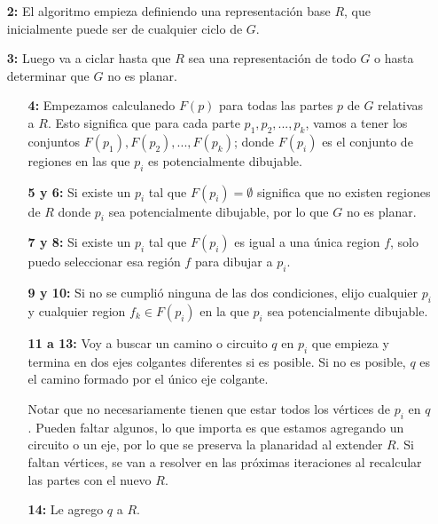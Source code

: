 \begin{enumerate}
\item [\textbf{2:}] El algoritmo empieza definiendo una representaci\'on base $R$, que inicialmente puede ser de cualquier ciclo de $G$. 
\item [\textbf{3:}] Luego va a ciclar hasta que $R$ sea una representaci\'on de todo $G$ o hasta determinar que $G$ no es planar.
    \begin{enumerate}
    \item [\textbf{4:}] Empezamos calculanedo $F(p)$ para todas las partes $p$ de $G$ relativas a $R$. Esto significa que para cada parte $p_1, p_2, ..., p_k$, vamos a tener los conjuntos $F(p_1), F(p_2), ..., F(p_k)$; donde $F(p_i)$ es el conjunto de regiones en las que $p_i$ es potencialmente dibujable.
    \item [\textbf{5 y 6:}] Si existe un $p_i$ tal que $F(p_i) = \emptyset$ significa que no existen regiones de $R$ donde $p_i$ sea potencialmente dibujable, por lo que $G$ no es planar.
    \item [\textbf{7 y 8:}] Si existe un $p_i$ tal que $F(p_i)$ es igual a una \'unica region $f$, solo puedo seleccionar esa regi\'on $f$ para dibujar a $p_i$.
    \item [\textbf{9 y 10:}] Si no se cumpli\'o ninguna de las dos condiciones, elijo cualquier $p_i$ y cualquier region $f_k \in F(p_i)$ en la que $p_i$ sea potencialmente dibujable.
    \item [\textbf{11 a 13:}] Voy a buscar un camino o circuito $q$ en $p_i$ que empieza y termina en dos ejes colgantes diferentes si es posible. Si no es posible, $q$ es el camino formado por el \'unico eje colgante.

    Notar que no necesariamente tienen que estar todos los v\'ertices de $p_i$ en $q$. Pueden faltar algunos, lo que importa es que estamos agregando un circuito o un eje, por lo que se preserva la planaridad al extender $R$. Si faltan v\'ertices, se van a resolver en las pr\'oximas iteraciones al recalcular las partes con el nuevo $R$.

    \item [\textbf{14:}] Le agrego $q$ a $R$.
    \end{enumerate}
\end{enumerate}
